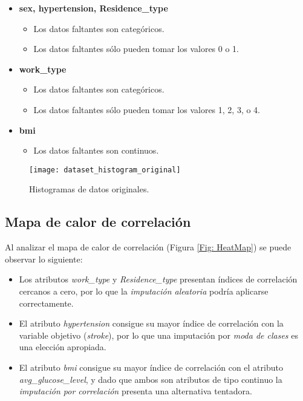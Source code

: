 \begin{itemize}
	\item \textbf{sex, hypertension, Residence\_type}
		\begin{itemize}
			\item Los datos faltantes son categóricos.
			\item Los datos faltantes sólo pueden tomar los valores 0 o 1.
		\end{itemize}
	\item \textbf{work\_type}
		\begin{itemize}
			\item Los datos faltantes son categóricos.
			\item Los datos faltantes sólo pueden tomar los valores 1, 2, 3, o 4.
		\end{itemize}
	\item \textbf{bmi}
		\begin{itemize}
			\item Los datos faltantes son continuos.
		\end{itemize}	
\end{itemize}

\begin{figure}[htbp]
	\centering
	\texttt{[image: dataset\_histogram\_original]}
	\caption{Histogramas de datos originales.}
	\label{Fig: HistOR}
\end{figure}

\newpage
\subsection{Mapa de calor de correlación}
Al analizar el mapa de calor de correlación (Figura \ref{Fig: HeatMap}) se puede observar lo siguiente:

\begin{itemize}
	\item Los atributos \emph{work\_type} y \emph{Residence\_type} presentan índices de correlación cercanos a cero, por lo que la \emph{imputación aleatoria} podría aplicarse correctamente.
	
	\item El atributo \emph{hypertension} consigue su mayor índice de correlación con la variable objetivo (\emph{stroke}), por lo que una imputación por \emph{moda de clases} es una elección apropiada.

	\item El atributo \emph{bmi} consigue su mayor índice de correlación con el atributo \emph{avg\_glucose\_level}, y dado que ambos son atributos de tipo continuo la \emph{imputación por correlación} presenta una alternativa tentadora.
\end{itemize}

